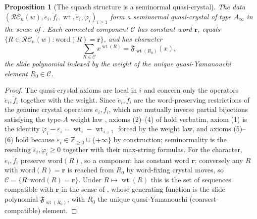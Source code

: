 \documentclass{amsart}
\newtheorem{proposition}[theorem]{Proposition}
\theoremstyle{definition}
\theoremstyle{remark}
\newcommand{\RC}{\mathcal{RC}}
\newcommand{\wtt}{\operatorname{wt}}
\begin{document}
\begin{proposition}[The squash structure is a seminormal quasi-crystal]\label{proposition:quasicrystalaxioms}
The data $(\RC_n(w),\ddot e_i,\ddot f_i,\wtt,\ddot\varepsilon_i,\ddot\varphi_i)_{i\geq 1}$ form a seminormal quasi-crystal of type $A_\infty$ in the sense of \cite[Definitions~3.1, 3.9]{cain2023quasicrystals}. Each connected component $\mathcal{C}$ has constant word $\mathbf r$, equals $\{R\in\RC_n(w):\mathrm{word}(R)=\mathbf r\}$, and has character
\[
\sum_{R\in\mathcal{C}}x^{\wtt(R)}=\mathfrak F_{\wtt(R_0)}(x),
\]
the slide polynomial indexed by the weight of the unique quasi-Yamanouchi element $R_0\in\mathcal{C}$.
\end{proposition}
\begin{proof}
The quasi-crystal axioms are local in $i$ and concern only the operators $\ddot e_i,\ddot f_i$ together with the weight. Since $\ddot e_i,\ddot f_i$ are the word-preserving restrictions of the genuine crystal operators $e_i,f_i$, which are mutually inverse partial bijections satisfying the type-$A$ weight law \cite{assaf2018demazure,morse2016crystal}, axioms (2)--(4) of \cite[Definition~3.1]{cain2023quasicrystals} hold verbatim, axiom (1) is the identity $\ddot\varphi_i-\ddot\varepsilon_i=\wtt_i-\wtt_{i+1}$ forced by the weight law, and axioms (5)--(6) hold because $\ddot\varepsilon_i\in\mathbb{Z}_{\geq 0}\cup\{+\infty\}$ by construction; seminormality \cite[Definition~3.9]{cain2023quasicrystals} is the resulting $\ddot\varepsilon_i,\ddot\varphi_i\geq 0$ together with their max-string formulas. For the character, $\ddot e_i,\ddot f_i$ preserve $\mathrm{word}(R)$, so a component has constant word $\mathbf r$; conversely any $R$ with $\mathrm{word}(R)=\mathbf r$ is reached from $R_0$ by word-fixing crystal moves, so $\mathcal{C}=\{R:\mathrm{word}(R)=\mathbf r\}$. Under $R\mapsto\wtt(R)$ this is the set of sequences compatible with $\mathbf r$ in the sense of \cite{bjs}, whose generating function is the slide polynomial $\mathfrak F_{\wtt(R_0)}$, with $R_0$ the unique quasi-Yamanouchi (coarsest-compatible) element.
\end{proof}
\end{document}
